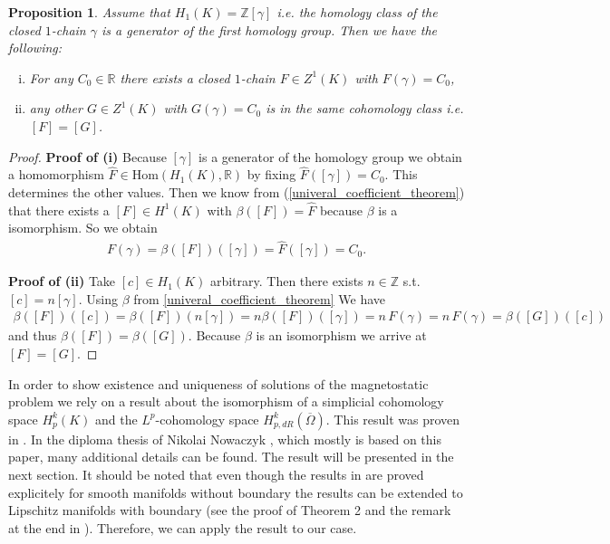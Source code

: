 \documentclass[12pt,a4paper]{article}
\newtheorem{proposition}{Proposition}
\theoremstyle{definition}
\newcommand{\integers}{\mathbb{Z}}
\newcommand{\omegabar}{\overline{\Omega}}
\newcommand{\real}{\mathbb{R}}
\begin{document}
\begin{proposition}\label{uniqueness_cochain}
    Assume that $H_1(K) = \integers [\gamma]$ i.e. the homology class of the 
    closed $1$-chain $\gamma$ is a generator of the first homology group.
    Then we have the following:
    \begin{enumerate}[(i)]
        \item For any $C_0 \in \real$ there exists a closed $1$-chain 
            $F \in Z^1(K)$ with $F(\gamma) = C_0$,
        \item any other $G \in Z^1(K)$ with $G(\gamma) = C_0$ 
            is in the same cohomology class i.e. $[F] = [G]$.
    \end{enumerate}
\end{proposition}
\begin{proof}
    \textbf{Proof of (i)} %
    Because $[\gamma]$ is a generator of the homology group we  obtain a 
    homomorphism $\hat{F} \in \text{Hom}(H_1(K),\real)$ by fixing
    $\hat{F}([\gamma]) = C_0$. This determines the other values.
    Then we know from (\ref{univeral_coefficient_theorem}) that there exists
    a $[F] \in H^1(K)$ with $\beta([F]) = \hat{F}$ because $\beta$ is a 
    isomorphism. So we obtain
    \begin{align*}
        F(\gamma) = \beta([F])([\gamma]) = \hat{F}([\gamma]) = C_0.
    \end{align*}

    \textbf{Proof of (ii)} %
    Take $[c] \in H_1(K)$ arbitrary. Then there exists  $n \in \integers$ s.t.
    $[c] = n [\gamma]$.
    Using $\beta$ from \ref{univeral_coefficient_theorem}
    We have
    \begin{align*}
        \beta([F])([c]) = \beta([F])(n [\gamma]) 
        = n \beta([F])([\gamma]) = n \, F(\gamma) = n \, F(\gamma) = 
        \beta([G])([c])
    \end{align*}
    and thus $\beta([F]) = \beta([G])$. Because $\beta$ is an isomorphism
    we arrive at $[F] = [G]$.
\end{proof}

In order to show existence and uniqueness of solutions of the magnetostatic 
problem we rely on a result about the isomorphism of a simplicial 
cohomology space $H^k_p(K)$ and the $L^p$-cohomology space 
$H^k_{p,dR}(\omegabar)$.
This result was proven in \cite{goldshtein}. In the diploma thesis of Nikolai
Nowaczyk \cite{nowaczyk}, which mostly is based on this paper, 
many additional details can be found. The result will be presented in the
next section. It should be noted that even though the results in 
\cite{goldshtein} are
proved explicitely for smooth manifolds without boundary the results can be 
extended to Lipschitz manifolds with boundary (see the proof of Theorem 2 and 
the remark at the end in \cite{goldshtein}). Therefore, we can apply the result
to our case.
\end{document}
